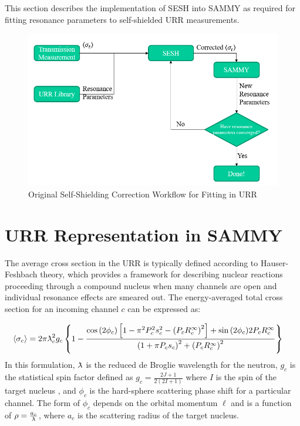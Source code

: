 This section describes the implementation of SESH into SAMMY as required for fitting resonance parameters to self-shielded URR measurements.

\begin{figure}
    \centering
    \includegraphics[width=0.75\linewidth]{Implementation/Figures/SelfShieldingWorkflow.png}
    \caption{Original Self-Shielding Correction Workflow for Fitting in URR}
    \label{fig:original-self-shielding-workflow}
\end{figure}

\section{URR Representation in SAMMY}

The average cross section in the URR is typically defined according to Hauser-Feshbach theory, which provides a framework for describing nuclear reactions proceeding through a compound nucleus when many channels are open and individual resonance effects are smeared out. The energy-averaged total cross section for an incoming channel $c$ can be expressed as:

\begin{equation}
    \label{eq:hauser-feshbach-cross-section}
    \langle \sigma_c \rangle =
    2 \pi \lambdabar_c^2 g_c \left\{
    1 - \frac{
            \cos{ ( 2 \phi_c)} \left[
                1 - \pi^2P_c^2 s_c^2 -  \left( P_c R_c^\infty \right)^2
            \right]
            + \sin{(2 \phi_c)} 2 P_c R_c^\infty
        }{
            \left( 1 + \pi P_c s_c \right)^2 + \left( P_c R_c^\infty \right)^2
    }
    \right\} \quad \text{}
\end{equation}
In this formulation, $\lambdabar$ is the reduced de Broglie wavelength for the neutron, $g_c$ is the statistical spin factor defined as $g_c = \frac{2J + 1}{2(2I + 1)}$ where $I$ is the spin of the target nucleus , and $\phi_c$ is the hard-sphere scattering phase shift for a particular channel. The form of $\phi_c$ depends on the orbital momentum $\ell$ and is a function of $\rho = \frac{a_c}{\lambdabar}$, where $a_c$ is the scattering radius of the target nucleus.

